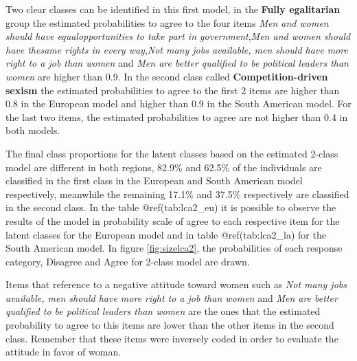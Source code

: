 \documentclass[12pt,twoside]{reedthesis}
\begin{document}
Two clear classes can be identified in this first model, in the \textbf{Fully egalitarian} group the estimated probabilities to agree to the four items \emph{Men and women should have equalopportunities to take part in government},\emph{Men and women should have thesame rights in every way},\emph{Not many jobs available, men should have more right to a job than women} and \emph{Men are better qualified to be political leaders than women} are higher than 0.9. In the second class called \textbf{Competition-driven sexism} the estimated probabilities to agree to the first 2 items are higher than 0.8 in the European model and higher than 0.9 in the South American model. For the last two items, the estimated probabilities to agree are not higher than 0.4 in both models.

The final class proportions for the latent classes based on the estimated 2-class model are different in both regions, 82.9\% and 62.5\% of the individuals are classified in the first class in the European and South American model respectively, meanwhile the remaining 17.1\% and 37.5\% respectively are classified in the second class. In the table @ref(tab:lca2\_eu) it is possible to observe the results of the model in probability scale of agree to each respective item for the latent classes for the European model and in table @ref(tab:lca2\_la) for the South American model. In figure \ref{fig:sizelca2}, the probabilities of each response category, Disagree and Agree for 2-class model are drawn.

Items that reference to a negative attitude toward women such as \emph{Not many jobs available, men should have more right to a job than women} and \emph{Men are better qualified to be political leaders than women} are the ones that the estimated probability to agree to this items are lower than the other items in the second class. Remember that these items were inversely coded in order to evaluate the attitude in favor of woman.
\end{document}
